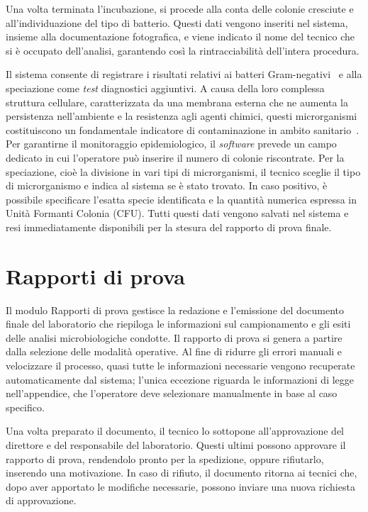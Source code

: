 Una volta terminata l'incubazione, si procede alla conta delle colonie cresciute e
all'individuazione del tipo di batterio. Questi dati vengono inseriti nel
sistema, insieme alla documentazione fotografica, e viene indicato il nome del
tecnico che si è occupato dell'analisi, garantendo così la rintracciabilità
dell'intera procedura. 

Il sistema consente di registrare i risultati relativi ai batteri Gram-negativi~\autocite{oliveiraGramNegativeBacteria2026} e alla speciazione come \textit{test} diagnostici aggiuntivi. A causa della loro complessa struttura cellulare, caratterizzata da una membrana esterna che ne aumenta la persistenza nell'ambiente e la resistenza agli agenti chimici, questi microrganismi costituiscono un fondamentale indicatore di contaminazione in ambito sanitario~\autocite{WHOBacterialPriority2024}. Per garantirne il monitoraggio epidemiologico, il \textit{software} prevede un campo dedicato in cui l'operatore può inserire il numero di colonie riscontrate.
Per la speciazione, cioè la divisione in vari tipi di microrganismi, il tecnico sceglie il tipo di
microrganismo e indica al sistema se è stato trovato. In caso positivo, è
possibile specificare l'esatta specie identificata e la quantità numerica
espressa in Unità Formanti Colonia (CFU). Tutti questi dati vengono salvati nel
sistema e resi immediatamente disponibili per la stesura del rapporto di prova
finale.
\section{Rapporti di prova}
Il modulo Rapporti di prova gestisce la
redazione e l'emissione del documento finale del laboratorio che riepiloga le
informazioni sul campionamento e gli esiti delle analisi microbiologiche
condotte. Il rapporto di prova si genera a partire dalla selezione delle
modalità operative. Al fine di ridurre gli errori manuali e velocizzare il
processo, quasi tutte le informazioni necessarie vengono recuperate
automaticamente dal sistema; l'unica eccezione riguarda le informazioni di
legge nell'appendice, che l'operatore deve selezionare manualmente in base al
caso specifico.

Una volta preparato il documento, il tecnico lo sottopone
all'approvazione del direttore e del responsabile del laboratorio. Questi
ultimi possono approvare il rapporto di prova, rendendolo pronto per la
spedizione, oppure rifiutarlo, inserendo una motivazione. In caso di rifiuto,
il documento ritorna ai tecnici che, dopo aver apportato le modifiche
necessarie, possono inviare una nuova richiesta di approvazione.

